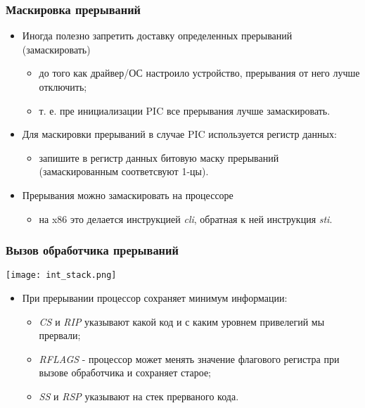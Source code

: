 \begin{frame}
\frametitle{Маскировка прерываний}
\begin{itemize}
  \item Иногда полезно запретить доставку определенных прерываний
  (замаскировать)
  \begin{itemize}
    \item до того как драйвер/ОС настроило устройство, прерывания от него лучше
    отключить;
    \item т. е. пре инициализации PIC все прерывания лучше замаскировать.
  \end{itemize}
  \item Для маскировки прерываний в случае PIC используется регистр данных:
  \begin{itemize}
    \item запишите в регистр данных битовую маску прерываний (замаскированным
    соответсвуют 1-цы).
  \end{itemize}
  \item Прерывания можно замаскировать на процессоре
  \begin{itemize}
    \item на x86 это делается инструкцией \emph{cli}, обратная к ней инструкция \emph{sti}.
  \end{itemize}
\end{itemize}
\end{frame}

\begin{frame}
\frametitle{Вызов обработчика прерываний}
\begin{center}
  \texttt{[image: int\_stack.png]}
\end{center}
\begin{itemize}
  \item При прерывании процессор сохраняет минимум информации:
  \begin{itemize}
    \item \emph{CS} и \emph{RIP} указывают какой код и с каким уровнем
    привелегий мы прервали;
    \item \emph{RFLAGS} - процессор может менять значение флагового регистра при
    вызове обработчика и сохраняет старое;
    \item \emph{SS} и \emph{RSP} указывают на стек прерваного кода.
  \end{itemize}
\end{itemize}
\end{frame}

